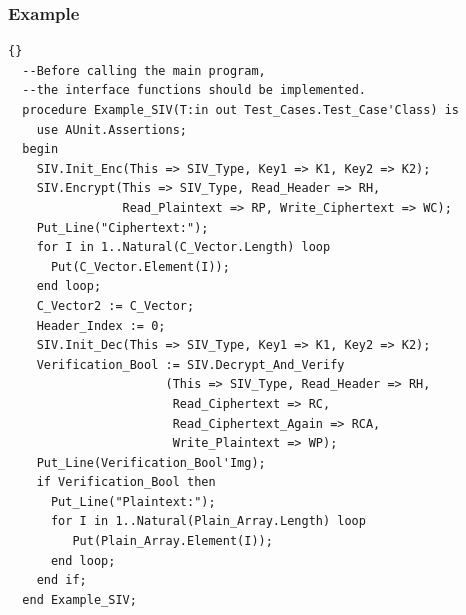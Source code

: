 \subsubsection*{Example}
\begin{lstlisting}{}
  --Before calling the main program,
  --the interface functions should be implemented.
  procedure Example_SIV(T:in out Test_Cases.Test_Case'Class) is
    use AUnit.Assertions;
  begin
    SIV.Init_Enc(This => SIV_Type, Key1 => K1, Key2 => K2);
    SIV.Encrypt(This => SIV_Type, Read_Header => RH,
                Read_Plaintext => RP, Write_Ciphertext => WC);
    Put_Line("Ciphertext:");
    for I in 1..Natural(C_Vector.Length) loop
      Put(C_Vector.Element(I));
    end loop;
    C_Vector2 := C_Vector;
    Header_Index := 0;
    SIV.Init_Dec(This => SIV_Type, Key1 => K1, Key2 => K2);
    Verification_Bool := SIV.Decrypt_And_Verify
                      (This => SIV_Type, Read_Header => RH,
                       Read_Ciphertext => RC,
                       Read_Ciphertext_Again => RCA,
                       Write_Plaintext => WP);
    Put_Line(Verification_Bool'Img);
    if Verification_Bool then
      Put_Line("Plaintext:");
      for I in 1..Natural(Plain_Array.Length) loop
         Put(Plain_Array.Element(I));
      end loop;
    end if;
  end Example_SIV;
\end{lstlisting}
